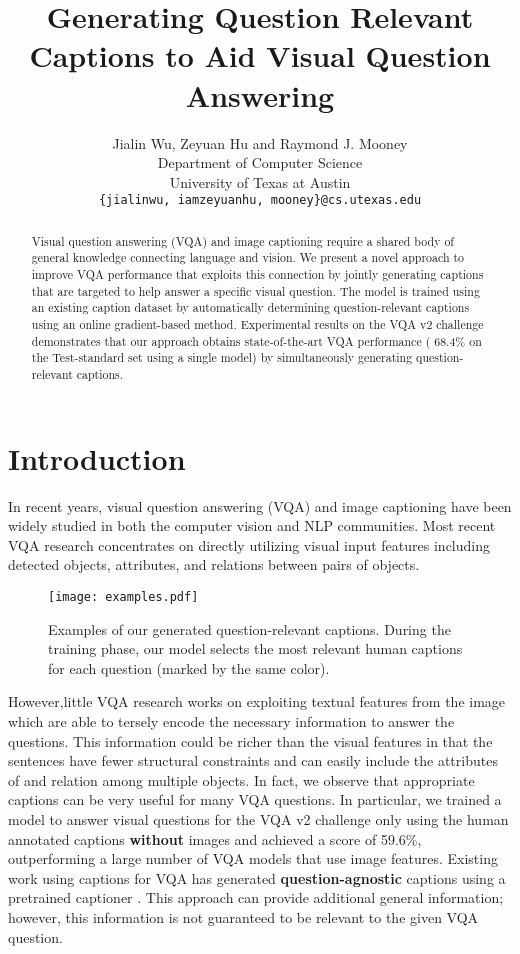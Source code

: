 \documentclass[11pt,a4paper]{article}
\title{Generating Question Relevant Captions to Aid Visual Question Answering}
\author{Jialin Wu, Zeyuan Hu and Raymond J. Mooney \\
  Department of Computer Science \\
  University of Texas at Austin \\
  \texttt{\{jialinwu, iamzeyuanhu, mooney\}@cs.utexas.edu}}
\date{}
\begin{document}
\maketitle
\begin{abstract}
Visual question answering (VQA) and image captioning require a shared body of general knowledge connecting language and vision. We present a novel approach to improve VQA performance that exploits this connection by jointly generating captions that are targeted to help answer a specific visual question. The model is trained using an existing caption dataset by automatically determining question-relevant captions using an online gradient-based method. Experimental results on the VQA v2 challenge demonstrates that our approach obtains state-of-the-art VQA performance ( 68.4\% on the Test-standard set using a single model) by simultaneously generating question-relevant captions.
\end{abstract}

\section{Introduction}
In recent years, visual question answering (VQA) \cite{antol2015vqa} and image captioning \cite{donahue2015long,rennie2017self} have been widely studied in both the computer vision and NLP communities. Most recent VQA research \cite{lu2017knowing,pedersoli2017areas,anderson2017bottom,lu2018r} concentrates on directly utilizing visual input features including detected objects, attributes, and relations between pairs of objects. 

\begin{figure}[!t]
\centering
\texttt{[image: examples.pdf]}
\caption{Examples of our generated question-relevant captions. During the training phase, our model selects the most relevant human captions for each question (marked by the same color).}
\label{fig:relevance_caption_example}
\end{figure}

However,little VQA research works on exploiting textual features from the image which are able to tersely encode the necessary information to answer the questions. This information could be richer than the visual features in that the sentences have fewer structural constraints and can easily include the attributes of and relation among multiple objects. In fact, we observe that appropriate captions can be very useful for many VQA questions. In particular, we trained a model to answer visual questions for the VQA v2 challenge \cite{antol2015vqa} only using the human annotated captions \textbf{without} images and achieved a score of 59.6\%, outperforming a large number of VQA models that use image features. Existing work using captions for VQA has generated \textbf{question-agnostic} captions using a pretrained captioner \cite{li2018tell}. This approach can provide additional general information; however, this information is not guaranteed to be relevant to the given VQA question. 
\end{document}
